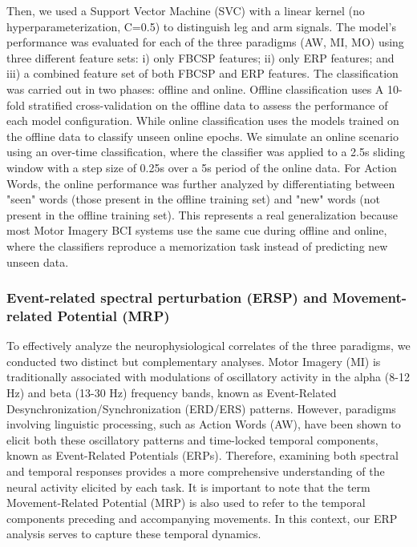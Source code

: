 \documentclass[10pt,letterpaper]{article}
\begin{document}
Then, we used a Support Vector Machine (SVC) with a linear kernel (no hyperparameterization, C=0.5) to distinguish leg and arm signals. The model's performance was evaluated for each of the three paradigms (AW, MI, MO) using three different feature sets: i) only FBCSP features; ii) only ERP features; and iii) a combined feature set of both FBCSP and ERP features. The classification was carried out in two phases: offline and online. Offline classification uses A 10-fold stratified cross-validation on the offline data to assess the performance of each model configuration. While online classification uses the models trained on the offline data to classify unseen online epochs. We simulate an online scenario using an over-time classification, where the classifier was applied to a 2.5s sliding window with a step size of 0.25s over a 5s period of the online data. For Action Words, the online performance was further analyzed by differentiating between "seen" words (those present in the offline training set) and "new" words (not present in the offline training set). This represents a real generalization because most Motor Imagery BCI systems use the same cue during offline and online, where the classifiers reproduce a memorization task instead of predicting new unseen data.

\subsubsection*{ Event-related spectral perturbation (ERSP) and Movement-related Potential (MRP)}


To effectively analyze the neurophysiological correlates of the three paradigms, we conducted two distinct but complementary analyses. Motor Imagery (MI) is traditionally associated with modulations of oscillatory activity in the alpha (8-12 Hz) and beta (13-30 Hz) frequency bands, known as Event-Related Desynchronization/Synchronization (ERD/ERS) patterns. However, paradigms involving linguistic processing, such as Action Words (AW), have been shown to elicit both these oscillatory patterns and time-locked temporal components, known as Event-Related Potentials (ERPs). Therefore, examining both spectral and temporal responses provides a more comprehensive understanding of the neural activity elicited by each task. It is important to note that the term Movement-Related Potential (MRP) is also used to refer to the temporal components preceding and accompanying movements. In this context, our ERP analysis serves to capture these temporal dynamics.
\end{document}
